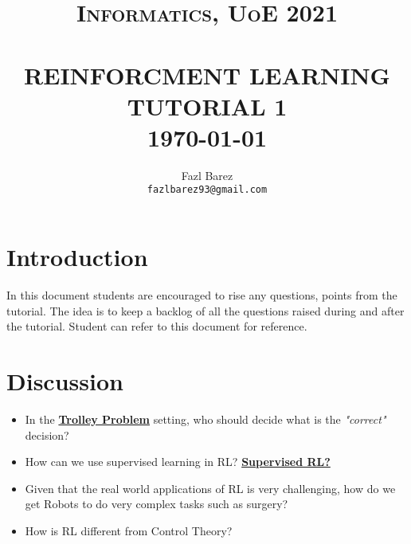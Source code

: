 \documentclass[paper=a4, fontsize=11pt,twoside]{scrartcl}	%
\title{	\normalsize \textsc{Informatics, UoE 2021} 	%
		 	\\[2.0cm]								%
			\HRule{0.5pt} \\						%
			\LARGE \textbf{\uppercase{Reinforcment Learning Tutorial 1}}	%
			\HRule{2pt} \\ [0.5cm]		%
			\normalsize \today			%
		}
\author{
		Fazl Barez\\	
        \texttt{fazlbarez93@gmail.com} \\
}
\makeatletter
\def\printtitle{%
    {\centering \@title\par}}
\def\printauthor{%
    {\centering \large \@author}}
\makeatother
\begin{document}
\thispagestyle{empty}		%

\printtitle					%
  	\vfill
\printauthor				%
\newpage
\setcounter{page}{1}		%
\section*{Introduction}

In this document students are encouraged to rise any questions, points from the tutorial. 
The idea is to keep a backlog of all the questions raised during and after the tutorial. Student can refer to this document for reference. 

\section*{Discussion}

\begin{itemize}
    \item {In the \href{https://en.wikipedia.org/wiki/Trolley_problem}{\textbf{Trolley Problem}} setting, who should decide what is the \textit{"correct"} decision?}
    \item {How can we use supervised learning in RL? \href{https://bair.berkeley.edu/blog/2020/10/13/supervised-rl/}{\textbf{Supervised RL?}}}
    \item{Given that the real world applications of RL is very challenging, how do we get Robots to do very complex tasks such as surgery?}
    \item How is RL different from Control Theory? 
\end{itemize}
\end{document}
